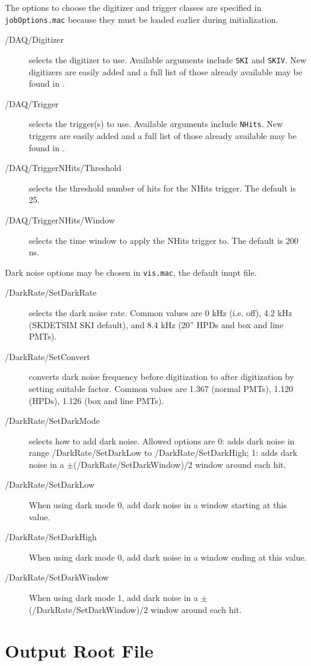 The options to choose the digitizer and trigger classes are specified in \texttt{jobOptions.mac} because they must be loaded earlier during initialization.
\begin{description}
\item[/DAQ/Digitizer] selects the digitizer to use. Available arguments include \texttt{SKI} and \texttt{SKIV}. New digitizers are easily added and a full list of those already available may be found in .
\item[/DAQ/Trigger] selects the trigger(s) to use. Available arguments include \texttt{NHits}. New triggers are easily added and a full list of those already available may be found in .
\item[/DAQ/TriggerNHits/Threshold] selects the threshold number of hits for the NHits trigger. The default is 25.
\item[/DAQ/TriggerNHits/Window] selects the time window to apply the NHits trigger to. The default is 200 ns.
\end{description}
Dark noise options may be chosen in \texttt{vis.mac}, the default inupt file.
\begin{description}
\item[/DarkRate/SetDarkRate] selects the dark noise rate. Common values are 0 kHz (i.e. off), 4.2 kHz (SKDETSIM SKI default), and 8.4 kHz (20'' HPDs and box and line PMTs).
\item[/DarkRate/SetConvert] converts dark noise frequency before digitization to after digitization by setting suitable factor. Common values are 1.367 (normal PMTs), 1.120 (HPDs), 1.126 (box and line PMTs).
\item[/DarkRate/SetDarkMode] selects how to add dark noise. Allowed options are 0: adds dark noise in range /DarkRate/SetDarkLow to /DarkRate/SetDarkHigh; 1: adds dark noise in a $\pm$(/DarkRate/SetDarkWindow)/2 window around each hit.
\item[/DarkRate/SetDarkLow] When using dark mode 0, add dark noise in a window starting at this value.
\item[/DarkRate/SetDarkHigh] When using dark mode 0, add dark noise in a window ending at this value.
\item[/DarkRate/SetDarkWindow] When using dark mode 1, add dark noise in a $\pm$(/DarkRate/SetDarkWindow)/2 window around each hit.
\end{description}

\section{Output Root File}

